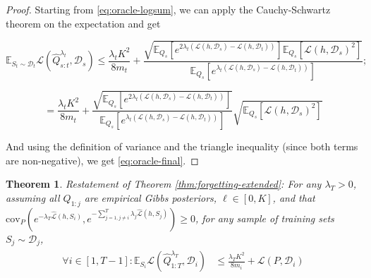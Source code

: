 \documentclass{article}
\theoremstyle{plain}
\newtheorem{theorem}{Theorem}[section]
\theoremstyle{definition}
\theoremstyle{remark}
\begin{document}
\begin{proof}
Starting from \eqref{eq:oracle-logsum}, we can apply the Cauchy-Schwartz theorem on the expectation and get

$$
\mathbb{E}_{S_t\sim \mathcal{D}_t}\mathcal{L}( \hat{Q}^{\lambda_t}_{s:t},\mathcal{D}_s)\leq \frac{\lambda_t K^2}{8m_t}+\frac{\sqrt{\mathbb{E}_{Q_s}\left [e^{2\lambda_t(\mathcal{L}(h,\mathcal{D}_s)-\mathcal{L}(h,\mathcal{D}_t))}\right ]\mathbb{E}_{Q_s}\left [\mathcal{L}(h,\mathcal{D}_s)^2 \right ]}}{\mathbb{E}_{Q_s}\left [e^{\lambda_t(\mathcal{L}(h,\mathcal{D}_s)-\mathcal{L}(h,\mathcal{D}_t))}\right ]};
$$

\begin{equation} \label{eq:oracle-CS-opt}
=\frac{\lambda_t K^2}{8m_t}+\frac{\sqrt{\mathbb{E}_{Q_s}\left [e^{2\lambda_t(\mathcal{L}(h,\mathcal{D}_s)-\mathcal{L}(h,\mathcal{D}_t))}\right ]}}{\mathbb{E}_{Q_s}\left [e^{\lambda_t(\mathcal{L}(h,\mathcal{D}_s)-\mathcal{L}(h,\mathcal{D}_t))}\right ]}\sqrt{\mathbb{E}_{Q_s}\left [\mathcal{L}(h,\mathcal{D}_s)^2 \right ]}
\end{equation}

And using the definition of variance and the triangle inequality (since both terms are non-negative), we get \eqref{eq:oracle-final}.

\end{proof}



\begin{theorem} Restatement of Theorem \ref{thm:forgetting-extended}:
For any $\lambda_T>0$, assuming all $Q_{1:j}$ are empirical Gibbs posteriors, $\ell\in[0,K]$, and that
 $\mathrm{cov}_{P}(e^{-\lambda_T\hat{\mathcal{L}}(h,S_i)}, e^{-\sum_{j=1,j\neq i}^{T}\lambda_j\hat{\mathcal{L}}(h,S_j)})\geq 0$,
for any sample of training sets $S_{j}\sim \mathcal{D}_j$,
%
\begin{align} 
\begin{split}
\forall i\in[1,T-1]:
\mathbb{E}_{S_i}\mathcal{L}(\hat{Q}^{\lambda_T}_{1:T}, \mathcal{D}_i) &\leq \frac{\lambda_T K^2}{8m_i}+\mathcal{L}(P,\mathcal{D}_i)
\end{split}
\end{align}
\end{theorem}
\end{document}
